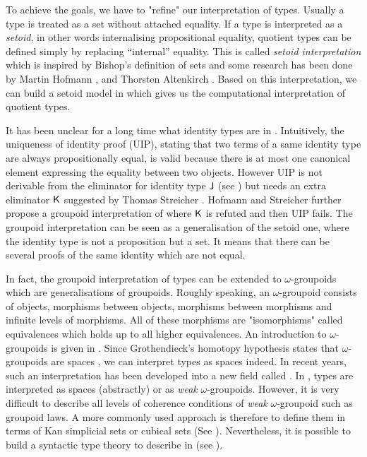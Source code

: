 To achieve the goals, we have to "refine" our interpretation of types. Usually a type is treated as a set without attached equality. If a type is interpreted as a \emph{setoid}, in other words internalising propositional equality, quotient types can be defined simply by replacing ``internal'' equality. This is called \emph{setoid interpretation} which is inspired by Bishop's \cite{bishop} definition of sets and 
some research has been done by Martin Hofmann \cite{hof:phd,hof:95:sm}, and Thorsten Altenkirch \cite{alti:lics99,alti:ott-conf}. Based on this interpretation, we can build a setoid model in \itt which gives us the  computational interpretation of quotient types.

It has been unclear for a long time what identity types are in \itt. Intuitively, the uniqueness of identity proof (UIP), stating that two terms of a same identity type are always propositionally equal, is valid because there is at most one canonical element expressing the equality between two objects. However UIP is not derivable from the eliminator for identity type $\operatorname{\mathsf{J}}$ (see ) but needs an extra eliminator $\operatorname{\mathsf{K}}$ suggested by Thomas Streicher \cite{streicherinvestigations}.
Hofmann and Streicher further \cite{MR1686862} propose a groupoid interpretation of \itt where $\operatorname{\mathsf{K}}$ is refuted and then UIP fails. The groupoid interpretation  can be seen as a generalisation of the setoid one, where the identity type is not a proposition but a set. It means that there can be several proofs of the same identity which are not equal.

In fact, the groupoid interpretation of types can be extended to $\omega$-groupoids which are generalisations of groupoids. Roughly speaking, an $\omega$-groupoid consists of objects, morphisms between objects, morphisms between morphisms and infinite levels of morphisms. All of these morphisms are "isomorphisms" called equivalences which holds up to all higher equivalences. An introduction to $\omega$-groupoids is given in .
Since Grothendieck's homotopy hypothesis states that $\omega$-groupoids are spaces \cite{homotopyhyp}, we can interpret types as spaces indeed. In recent years, such an interpretation has been developed into a new field called \hott. In \hott, types are interpreted as spaces (abstractly) or as \emph{weak} $\omega$-groupoids. However, it is very difficult to describe all levels of coherence conditions of \emph{weak} $\omega$-groupoid such as groupoid laws. A more commonly used approach is therefore to define them in terms of Kan simplicial sets or cubical sets (See ). 
Nevertheless, it is possible to build a syntactic type theory to describe \wog in \itt (see ).

